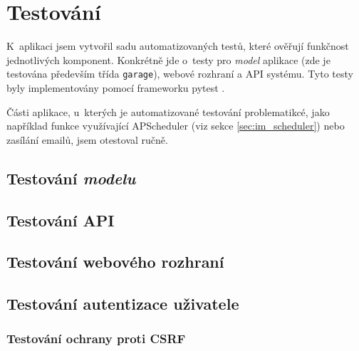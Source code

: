 \chapter{Testování}
\label{sec:te}

K~aplikaci jsem vytvořil sadu automatizovaných testů, které ověřují funkčnost jednotlivých komponent. Konkrétně jde o~testy pro \textit{model} aplikace (zde je testována především třída \texttt{garage}), webové rozhraní a API systému. Tyto testy byly implementovány pomocí frameworku pytest \cite{pytest}.

Části aplikace, u~kterých je automatizované testování problematikcé, jako například funkce využívající APScheduler (viz sekce \ref{sec:im_scheduler}) nebo zasílání emailů, jsem otestoval ručně.

\section{Testování \textit{modelu}}


\section{Testování API}

\section{Testování webového rozhraní}

\section{Testování autentizace uživatele}


\subsection{Testování ochrany proti CSRF}


